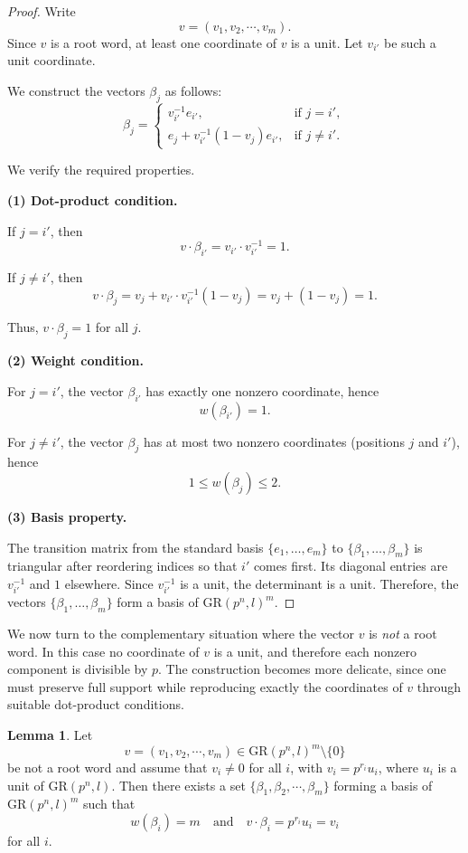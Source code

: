 \documentclass[10pt]{article}
\theoremstyle{definition}
\newtheorem{lemma}[lem]{Lemma}
\begin{document}
\begin{proof}
Write
\[
v=(v_1,v_2,\cdots,v_m).
\]
Since $v$ is a root word, at least one coordinate of $v$ is a unit. Let $v_{i'}$ be such a unit coordinate.

We construct the vectors $\beta_j$ as follows:
\[
\beta_j=
\begin{cases}
v_{i'}^{-1} e_{i'}, & \text{if } j=i',\\
e_j + v_{i'}^{-1}(1-v_j)e_{i'}, & \text{if } j\neq i'.
\end{cases}
\]

We verify the required properties.

\medskip
\noindent
\textbf{(1) Dot-product condition.}

If $j=i'$, then
\[
v\cdot \beta_{i'}
= v_{i'} \cdot v_{i'}^{-1}
=1.
\]

If $j\neq i'$, then
\[
v\cdot \beta_j
= v_j + v_{i'} \cdot v_{i'}^{-1}(1-v_j)
= v_j + (1-v_j)
=1.
\]

Thus, $v\cdot \beta_j=1$ for all $j$.

\medskip
\noindent
\textbf{(2) Weight condition.}

For $j=i'$, the vector $\beta_{i'}$ has exactly one nonzero coordinate, hence
\[
w(\beta_{i'})=1.
\]

For $j\neq i'$, the vector $\beta_j$ has at most two nonzero coordinates (positions $j$ and $i'$), hence
\[
1\leq w(\beta_j)\leq 2.
\]

\medskip
\noindent
\textbf{(3) Basis property.}

The transition matrix from the standard basis $\{e_1,\dots,e_m\}$ to $\{\beta_1,\dots,\beta_m\}$ is triangular after reordering indices so that $i'$ comes first. Its diagonal entries are $v_{i'}^{-1}$ and $1$ elsewhere. Since $v_{i'}^{-1}$ is a unit, the determinant is a unit. Therefore, the vectors $\{\beta_1,\dots,\beta_m\}$ form a basis of $\mathrm{GR}(p^n,l)^m$.
\end{proof}





\medskip

We now turn to the complementary situation where the vector $v$ is
\emph{not} a root word. In this case no coordinate of $v$ is a unit,
and therefore each nonzero component is divisible by $p$.
The construction becomes more delicate, since one must preserve
full support while reproducing exactly the coordinates of $v$
through suitable dot-product conditions.

\begin{lemma}\label{Lemma 21}
Let
\[
v=(v_1,v_2,\cdots,v_m)\in \mathrm{GR}(p^n,l)^m\setminus\{0\}
\]
be not a root word and assume that $v_i\neq 0$ for all $i$,
with $v_i=p^{r_i}u_i$, where $u_i$ is a unit of $\mathrm{GR}(p^n,l)$.
Then there exists a set $\{\beta_1,\beta_2,\cdots,\beta_m\}$
forming a basis of $\mathrm{GR}(p^n,l)^m$ such that
\[
w(\beta_i)= m
\quad\text{and}\quad
v\cdot \beta_i=p^{r_i}u_i=v_i
\]
for all $i$.
\end{lemma}
\end{document}
